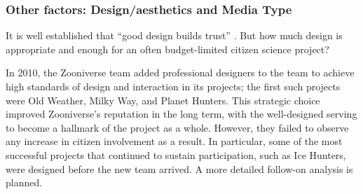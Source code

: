 \documentclass{sigchi}
\begin{document}
\subsubsection{Other factors: Design/aesthetics and Media Type}



It is well established that ``good design builds trust'' \cite{norman2002design}. But how much design is appropriate and enough for an often budget-limited citizen science project?   %

In 2010, the Zooniverse team added professional designers to the team to achieve high standards of design and interaction in its projects; the first such projects were Old Weather, Milky Way, and Planet Hunters.  This strategic choice improved Zooniverse's reputation in the long term, with the well-designed serving to become a hallmark of the project as a whole.  However, they failed to observe any increase in citizen involvement as a result.  In particular, some of the most successful projects that continued to sustain participation, such as Ice Hunters, were designed before the new team arrived.  A more detailed follow-on analysis is planned.

\end{document}
